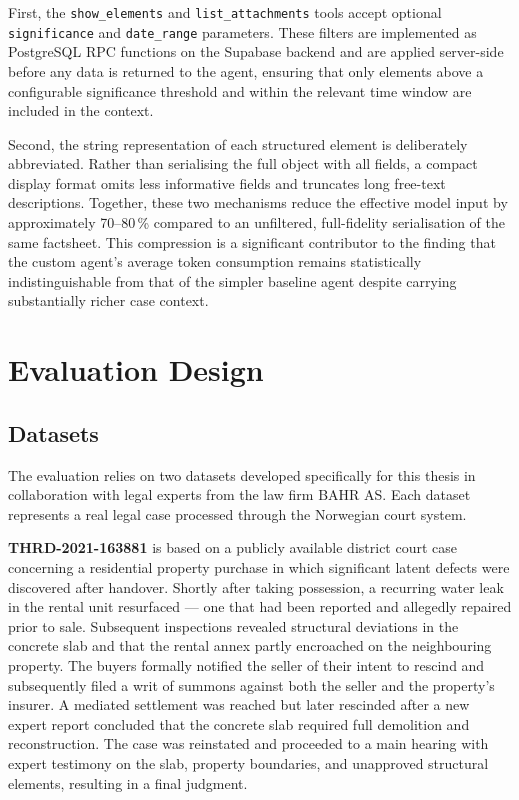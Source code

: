 First, the \texttt{show\_elements} and \texttt{list\_attachments} tools accept optional \texttt{significance} and \texttt{date\_range} parameters. These filters are implemented as PostgreSQL RPC functions on the Supabase backend and are applied server-side before any data is returned to the agent, ensuring that only elements above a configurable significance threshold and within the relevant time window are included in the context.

Second, the string representation of each structured element is deliberately abbreviated. Rather than serialising the full object with all fields, a compact display format omits less informative fields and truncates long free-text descriptions. Together, these two mechanisms reduce the effective model input by approximately 70--80\,\% compared to an unfiltered, full-fidelity serialisation of the same factsheet. This compression is a significant contributor to the finding that the custom agent's average token consumption remains statistically indistinguishable from that of the simpler baseline agent despite carrying substantially richer case context.



\section{Evaluation Design}

\subsection{Datasets}
The evaluation relies on two datasets developed specifically for this thesis in collaboration with legal experts from the law firm BAHR AS. Each dataset represents a real legal case processed through the Norwegian court system.

\textbf{THRD-2021-163881} is based on a publicly available district court case concerning a residential property purchase in which significant latent defects were discovered after handover. Shortly after taking possession, a recurring water leak in the rental unit resurfaced — one that had been reported and allegedly repaired prior to sale. Subsequent inspections revealed structural deviations in the concrete slab and that the rental annex partly encroached on the neighbouring property. The buyers formally notified the seller of their intent to rescind and subsequently filed a writ of summons against both the seller and the property's insurer. A mediated settlement was reached but later rescinded after a new expert report concluded that the concrete slab required full demolition and reconstruction. The case was reinstated and proceeded to a main hearing with expert testimony on the slab, property boundaries, and unapproved structural elements, resulting in a final judgment.

